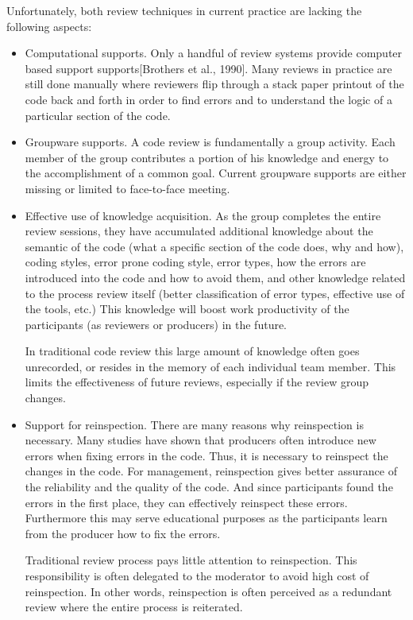 Unfortunately, both review techniques in current practice are lacking
the following aspects:
\begin {itemize}
\item Computational supports. Only a
handful of review systems provide computer based support
supports[Brothers et al., 1990].  
Many reviews in  practice are still done manually where 
reviewers flip through a stack paper printout of the code back
and forth in order to find errors and to understand the logic
of a particular section of the code.

\item Groupware supports. A code review is fundamentally a 
group activity.  Each member of the group contributes a portion
of his knowledge and energy to the accomplishment of a common goal.  
Current groupware supports are
either missing  or limited to face-to-face meeting.

\item Effective use of knowledge acquisition.  As the group
completes the entire review sessions, they have accumulated 
additional knowledge about the semantic of the code (what 
a specific section of the code does, why and how),
coding styles, error prone coding style, error
types, how the errors are introduced into the code and how to avoid them, 
and other knowledge related to the  process review itself (better 
classification of error types, effective use of the tools, etc.)
This knowledge will boost work productivity of the participants
(as reviewers or producers) in the future.

In traditional code review this large amount of knowledge 
often goes unrecorded, or
resides in the memory of each individual team member.
This limits the effectiveness of future reviews, especially
if the review group changes.

\item Support for reinspection.
There are many reasons why reinspection is necessary.
Many studies have shown that producers often introduce new
errors when fixing errors in the code.  Thus, it is necessary
to reinspect the changes in the code.
For management, reinspection gives better assurance of the
reliability  and the quality of the code. And since  participants
found the errors in the first place, they can
effectively reinspect these errors. Furthermore
this may serve  educational purposes as the participants learn from
the producer how to fix the errors.

Traditional review process pays little attention to reinspection. 
This responsibility is often delegated to the moderator to avoid
high cost of reinspection. In other words, reinspection is 
often perceived as a redundant review  where the entire process
is reiterated.


\end{itemize}
